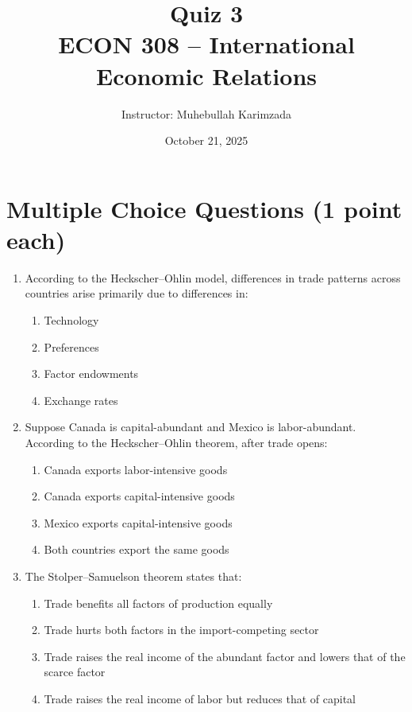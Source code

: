 \documentclass[12pt]{article}
\title{Quiz 3\\ \vspace{8pt} \Large ECON 308 -- International Economic Relations}
\author{Instructor: Muhebullah Karimzada}
\date{October 21,  2025}
\begin{document}
\maketitle


\section*{Multiple Choice Questions (1 point each)}

\begin{enumerate}
    \item According to the Heckscher--Ohlin model, differences in trade patterns across countries arise primarily due to differences in:  
    \begin{enumerate}
        \item Technology  
        \item Preferences  
        \item Factor endowments  
        \item Exchange rates  
    \end{enumerate}

    \item Suppose Canada is capital-abundant and Mexico is labor-abundant. According to the Heckscher--Ohlin theorem, after trade opens:  
    \begin{enumerate}
        \item Canada exports labor-intensive goods  
        \item Canada exports capital-intensive goods  
        \item Mexico exports capital-intensive goods  
        \item Both countries export the same goods  
    \end{enumerate}

    \item The Stolper--Samuelson theorem states that:  
    \begin{enumerate}
        \item Trade benefits all factors of production equally  
        \item Trade hurts both factors in the import-competing sector  
        \item Trade raises the real income of the abundant factor and lowers that of the scarce factor  
        \item Trade raises the real income of labor but reduces that of capital  
    \end{enumerate}


\end{enumerate}
\end{document}
